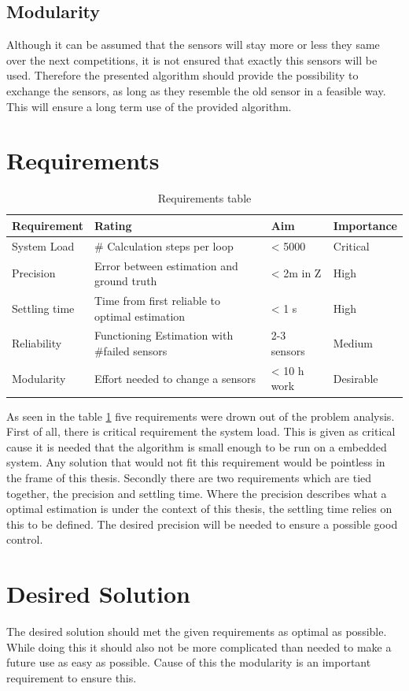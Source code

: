  \subsection{Modularity}
 Although it can be assumed that the sensors will stay more or less they same over the next competitions, it is not ensured that exactly this sensors will be used.
 Therefore the presented algorithm should provide the possibility to exchange the sensors, as long as they resemble the old sensor in a feasible way.
 This will ensure a long term use of the provided algorithm.
 
 \section{Requirements}
 
 \begin{table}[h]
 \centering
 \begin{tabular}{|l|l|l|l|}	
 \hline	
 \bf{Requirement}   & \bf{Rating} & \bf{Aim} & \bf{Importance} \\ \hline
 System Load   & \# Calculation steps per loop & < 5000 & Critical \\ \hline
 Precision     & Error between estimation and ground truth  & < 2m in Z & High  \\ \hline
 Settling time & Time from first reliable to optimal estimation  & < 1 s &  High \\ \hline
 Reliability   & Functioning Estimation with \#failed sensors & 2-3 sensors & Medium \\ \hline	
 Modularity    & Effort needed to change a sensors & < 10 h work &  Desirable \\ \hline
 \end{tabular}	
 \caption{Requirements table}
 \label{tab:Requirements}
 \end{table}
 
 As seen in the table \ref{tab:Requirements} five requirements were drown out of the problem analysis. 
 First of all, there is critical requirement the system load. This is given as critical cause it is needed that the algorithm is small enough to be run on a embedded system.
 Any solution that would not fit this requirement would be pointless in the frame of this thesis.
 Secondly there are two requirements which are tied together, the precision and settling time.
 Where the precision describes what a optimal estimation is under the context of this thesis, the settling time relies on this to be defined.
 The desired precision will be needed to ensure a possible good control.
 
 \section{Desired Solution}
 The desired solution should met the given requirements as optimal as possible. While doing this it should also not be more complicated than needed
 to make a future use as easy as possible. Cause of this the modularity is an important requirement to ensure this.

